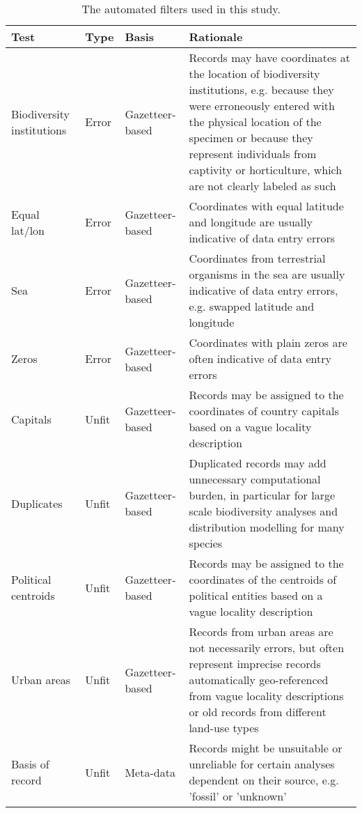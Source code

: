 \documentclass[fleqn,10pt,lineno]{wlpeerj} %
\begin{document}
\begin{table}[!h]

\caption{\label{tab:tabletests}The automated filters used in this study.}
\centering
\fontsize{9}{11}\selectfont
\begin{tabular}[t]{>{\raggedright\arraybackslash}p{2cm}>{\raggedright\arraybackslash}p{1cm}>{\raggedright\arraybackslash}p{2.5cm}>{\raggedright\arraybackslash}p{9cm}}
\toprule
Test & Type & Basis & Rationale\\
\midrule
\rowcolor{gray!6}  Biodiversity institutions & Error & Gazetteer-based & Records may have coordinates at the location of biodiversity institutions, e.g. because they were erroneously entered with the physical location of the specimen or because they represent individuals from captivity or horticulture, which are not clearly labeled as such\\
Equal lat/lon & Error & Gazetteer-based & Coordinates with equal latitude and longitude are usually indicative of data entry errors\\
\rowcolor{gray!6}  Sea & Error & Gazetteer-based & Coordinates from terrestrial organisms in the sea are usually indicative of data entry errors, e.g. swapped latitude and longitude\\
Zeros & Error & Gazetteer-based & Coordinates with plain zeros are often indicative of data entry errors\\
\rowcolor{gray!6}  Capitals & Unfit & Gazetteer-based & Records may be assigned to the coordinates of country capitals based on a vague locality description\\
\addlinespace
Duplicates & Unfit & Gazetteer-based & Duplicated records may add unnecessary computational burden, in particular for large scale biodiversity analyses and distribution modelling for many species\\
\rowcolor{gray!6}  Political centroids & Unfit & Gazetteer-based & Records may be assigned to the coordinates of the centroids of political entities based on a vague locality description\\
Urban areas & Unfit & Gazetteer-based & Records from urban areas are not necessarily errors, but often represent imprecise records automatically geo-referenced from vague locality descriptions or old records from different land-use types\\
\rowcolor{gray!6}  Basis of record & Unfit & Meta-data & Records might be unsuitable or unreliable for certain analyses dependent on their source, e.g. 'fossil' or 'unknown'\\

\end{tabular}
\end{table}
\end{document}
